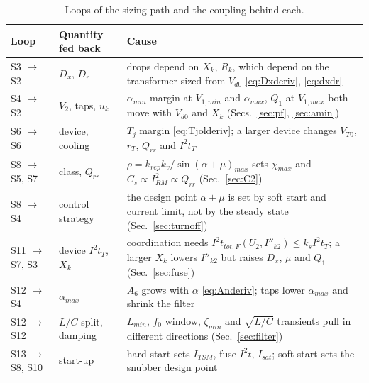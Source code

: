 \documentclass[10pt,a4paper]{scrartcl}
\newcommand{\Vdo}{V_{d0}}
\newcommand{\Vll}{V_{2}}
\newcommand{\Xk}{X_{k}}
\newcommand{\Rk}{R_{k}}
\newcommand{\uk}{u_{k}}
\newcommand{\Dx}{D_{x}}
\newcommand{\Dr}{D_{r}}
\newcommand{\ITSM}{I_{TSM}}
\newcommand{\iit}{I^{2}t}
\newcommand{\Tj}{T_{j}}
\begin{document}
\begin{table}[htb]
\centering\footnotesize
\caption{Loops of the sizing path and the coupling behind each.}
\label{tab:loops}
\begin{tabular}{@{}llp{8.6cm}@{}}
\toprule
Loop & Quantity fed back & Cause \\
\midrule
S3 $\to$ S2 & $\Dx$, $\Dr$ & drops depend on $\Xk$, $\Rk$, which depend on the transformer sized from $\Vdo$ \eqref{eq:Dxderiv}, \eqref{eq:dxdr} \\
S4 $\to$ S2 & $\Vll$, taps, $\uk$ & $\alpha_{min}$ margin at $V_{1,min}$ and $\alpha_{max}$, $Q_1$ at $V_{1,max}$ both move with $\Vdo$ and $\Xk$ (Secs.~\ref{sec:pf}, \ref{sec:amin}) \\
S6 $\to$ S6 & device, cooling & $\Tj$ margin \eqref{eq:Tjolderiv}; a larger device changes $V_{T0}$, $r_T$, $Q_{rr}$ and $\iit_T$ \\
S8 $\to$ S5, S7 & class, $Q_{rr}$ & $\rho = k_{rep}k_v/\sin(\alpha+\mu)_{max}$ sets $\chi_{max}$ and $C_s\propto I_{RM}^2\propto Q_{rr}$ (Sec.~\ref{sec:C2}) \\
S8 $\to$ S4 & control strategy & the design point $\alpha+\mu$ is set by soft start and current limit, not by the steady state (Sec.~\ref{sec:turnoff}) \\
S11 $\to$ S7, S3 & device $\iit_T$, $\Xk$ & coordination needs $\iit_{tot,F}(U_2,I''_{k2})\le k_s\iit_T$; a larger $\Xk$ lowers $I''_{k2}$ but raises $\Dx$, $\mu$ and $Q_1$ (Sec.~\ref{sec:fuse}) \\
S12 $\to$ S4 & $\alpha_{max}$ & $A_6$ grows with $\alpha$ \eqref{eq:Anderiv}; taps lower $\alpha_{max}$ and shrink the filter \\
S12 $\to$ S12 & $L/C$ split, damping & $L_{min}$, $f_0$ window, $\zeta_{min}$ and $\sqrt{L/C}$ transients pull in different directions (Sec.~\ref{sec:filter}) \\
S13 $\to$ S8, S10 & start-up & hard start sets $\ITSM$, fuse $\iit$, $I_{sat}$; soft start sets the snubber design point \\
\bottomrule
\end{tabular}
\end{table}

\end{document}
